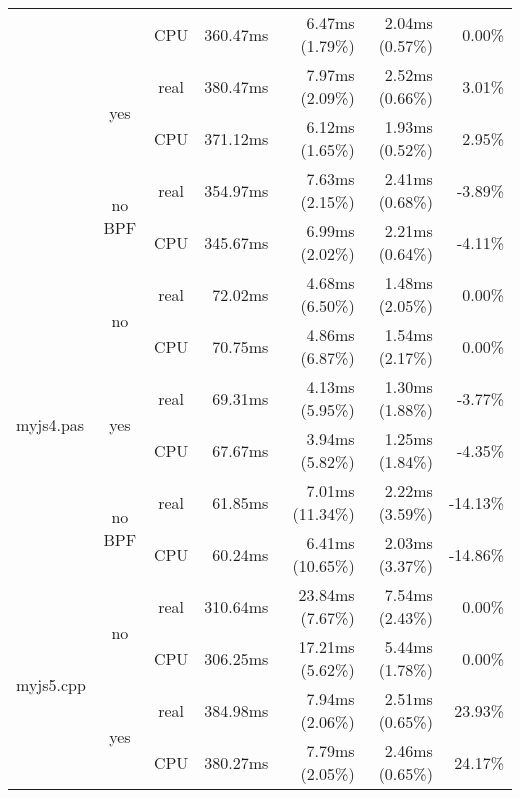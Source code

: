\documentclass[en]{pracamgr}
\begin{document}
\begin{appendices}
\begin{small}
\begin{longtable}{|l|c|c|r|r|r|r|}
                            &                         & CPU  & 360.47ms & 6.47ms (1.79\%) & 2.04ms (0.57\%) & 0.00\% \\*
                            \cline{2-7}
                            & \multirow{2}{*}{yes}    & real & 380.47ms & 7.97ms (2.09\%) & 2.52ms (0.66\%) & 3.01\% \\*
                            &                         & CPU  & 371.12ms & 6.12ms (1.65\%) & 1.93ms (0.52\%) & 2.95\% \\*
                            \cline{2-7}
                            & \multirow{2}{*}{no BPF} & real & 354.97ms & 7.63ms (2.15\%) & 2.41ms (0.68\%) & -3.89\% \\*
                            &                         & CPU  & 345.67ms & 6.99ms (2.02\%) & 2.21ms (0.64\%) & -4.11\% \\
\hline
\multirow{6}{*}{myjs4.pas}  & \multirow{2}{*}{no}     & real & 72.02ms & 4.68ms (6.50\%) & 1.48ms (2.05\%) & 0.00\% \\*
                            &                         & CPU  & 70.75ms & 4.86ms (6.87\%) & 1.54ms (2.17\%) & 0.00\% \\*
                            \cline{2-7}
                            & \multirow{2}{*}{yes}    & real & 69.31ms & 4.13ms (5.95\%) & 1.30ms (1.88\%) & -3.77\% \\*
                            &                         & CPU  & 67.67ms & 3.94ms (5.82\%) & 1.25ms (1.84\%) & -4.35\% \\*
                            \cline{2-7}
                            & \multirow{2}{*}{no BPF} & real & 61.85ms & 7.01ms (11.34\%) & 2.22ms (3.59\%) & -14.13\% \\*
                            &                         & CPU  & 60.24ms & 6.41ms (10.65\%) & 2.03ms (3.37\%) & -14.86\% \\
\hline
\multirow{6}{*}{myjs5.cpp}  & \multirow{2}{*}{no}     & real & 310.64ms & 23.84ms (7.67\%) & 7.54ms (2.43\%) & 0.00\% \\*
                            &                         & CPU  & 306.25ms & 17.21ms (5.62\%) & 5.44ms (1.78\%) & 0.00\% \\*
                            \cline{2-7}
                            & \multirow{2}{*}{yes}    & real & 384.98ms & 7.94ms (2.06\%) & 2.51ms (0.65\%) & 23.93\% \\*
                            &                         & CPU  & 380.27ms & 7.79ms (2.05\%) & 2.46ms (0.65\%) & 24.17\% \\*

\end{longtable}
\end{small}
\end{appendices}
\end{document}
